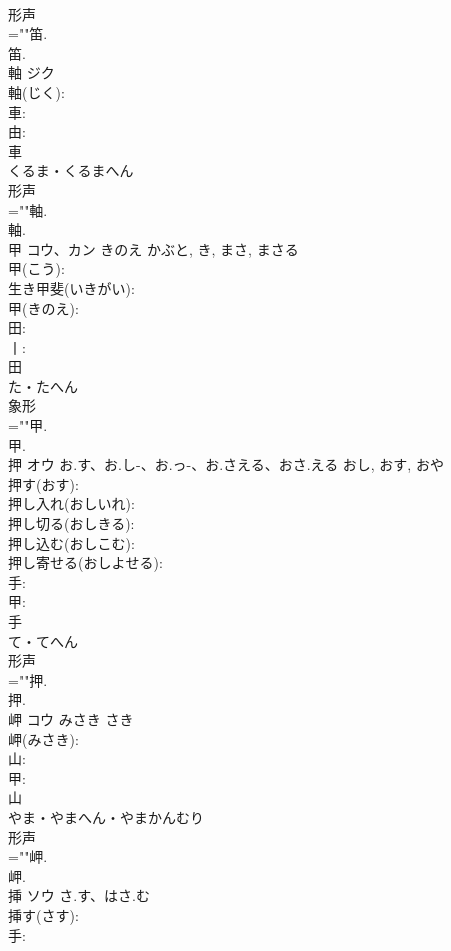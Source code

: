\documentclass[8pt]{extreport}
\begin{document}
\begin{CJK}{UTF8}{min}
\\	形声 
\\	=""笛.
\\	笛.
\\	軸	ジク			
\\	軸(じく): 
\\	車: 
\\	由: 
\\	車	
\\	くるま・くるまへん	
\\	形声 
\\	=""軸.
\\	軸.
\\	甲	コウ、カン	きのえ	かぶと, き, まさ, まさる	
\\	甲(こう): 
\\	生き甲斐(いきがい): 
\\	甲(きのえ): 
\\	田: 
\\	丨: 
\\	田	
\\	た・たへん	
\\	象形 
\\	=""甲.
\\	甲.
\\	押	オウ	お.す、お.し-、お.っ-、お.さえる、おさ.える	おし, おす, おや	
\\	押す(おす): 
\\	押し入れ(おしいれ): 
\\	押し切る(おしきる): 
\\	押し込む(おしこむ): 
\\	押し寄せる(おしよせる): 
\\	手: 
\\	甲: 
\\	手	
\\	て・てへん	
\\	形声 
\\	=""押.
\\	押.
\\	岬	コウ	みさき	さき	
\\	岬(みさき): 
\\	山: 
\\	甲: 
\\	山	
\\	やま・やまへん・やまかんむり	
\\	形声 
\\	=""岬.
\\	岬.
\\	挿	ソウ	さ.す、はさ.む		
\\	挿す(さす): 
\\	手: 

\end{CJK}
\end{document}

